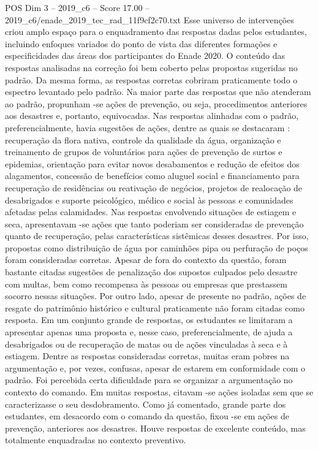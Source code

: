 \begin{textsample}{POS Dim 3 – 2019\_c6 – Score 17.00 – 2019\_c6/enade\_2019\_tec\_rad\_11f9cf2c70.txt}
Esse universo de intervenções criou amplo espaço para o enquadramento das respostas dadas pelos estudantes, incluindo enfoques variados do ponto de vista das diferentes formações e especificidades das áreas dos participantes do Enade 2020.
O conteúdo das respostas analisadas na correção foi bem coberto pelas propostas sugeridas no padrão.
Da mesma forma, as respostas corretas cobriram praticamente todo o espectro levantado pelo padrão.
Na maior parte das respostas que não atenderam ao padrão, propunham -se ações de prevenção, ou seja, procedimentos anteriores aos desastres e, portanto, equivocadas.
Nas respostas alinhadas com o padrão, preferencialmente, havia sugestões de ações, dentre as quais se destacaram : recuperação da flora nativa, controle da qualidade da água, organização e treinamento de grupos de voluntários para ações de prevenção de surtos e epidemias, orientação para evitar novos desabamentos e redução de efeitos dos alagamentos, concessão de benefícios como aluguel social e financiamento para recuperação de residências ou reativação de negócios, projetos de realocação de desabrigados e suporte psicológico, médico e social às pessoas e comunidades afetadas pelas calamidades.
Nas respostas envolvendo situações de estiagem e seca, apresentavam -se ações que tanto poderiam ser consideradas de prevenção quanto de recuperação, pelas características sistêmicas desses desastres.
Por isso, propostas como distribuição de água por caminhões pipa ou perfuração de poços foram consideradas corretas.
Apesar de fora do contexto da questão, foram bastante citadas sugestões de penalização dos supostos culpados pelo desastre com multas, bem como recompensa às pessoas ou empresas que prestassem socorro nessas situações.
Por outro lado, apesar de presente no padrão, ações de resgate do patrimônio histórico e cultural praticamente não foram citadas como resposta.
Em um conjunto grande de respostas, os estudantes se limitaram a apresentar apenas uma proposta e, nesse caso, preferencialmente, de ajuda a desabrigados ou de recuperação de matas ou de ações vinculadas à seca e à estiagem.
Dentre as respostas consideradas corretas, muitas eram pobres na argumentação e, por vezes, confusas, apesar de estarem em conformidade com o padrão.
Foi percebida certa dificuldade para se organizar a argumentação no contexto do comando.
Em muitas respostas, citavam -se ações isoladas sem que se caracterizasse o seu desdobramento.
Como já comentado, grande parte dos estudantes, em desacordo com o comando da questão, fixou -se em ações de prevenção, anteriores aos desastres.
Houve respostas de excelente conteúdo, mas totalmente enquadradas no contexto preventivo.

\end{textsample}
